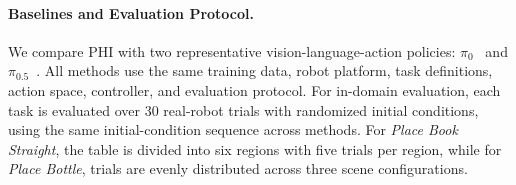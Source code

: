 \documentclass{article} %
\begin{document}

\paragraph{Baselines and Evaluation Protocol.}
We compare PHI with two representative vision-language-action policies: $\pi_0$~\cite{black2024pi0} and $\pi_{0.5}$~\cite{black2025pi05}. All methods use the same training data, robot platform, task definitions, action space, controller, and evaluation protocol. For in-domain evaluation, each task is evaluated over 30 real-robot trials with randomized initial conditions, using the same initial-condition sequence across methods. For \textit{Place Book Straight}, the table is divided into six regions with five trials per region, while for \textit{Place Bottle}, trials are evenly distributed across three scene configurations.

\end{document}
